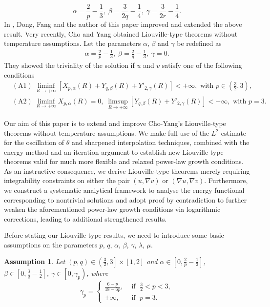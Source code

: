\documentclass[11pt,reqno]{amsart}
\newtheorem{Assum}{Assumption}[section]
\numberwithin{Thm}{section}
\begin{document}
$$
\alpha=\frac{2}{p}-\frac{1}{3},\;\beta=\frac{3}{2q}-\frac{1}{4},\;\gamma=\frac{3}{2r}-\frac{1}{4}.
$$
In \cite{DFZ26}, Dong, Fang and the author of this paper improved and extended the above result.
Very recently, Cho and Yang \cite{CY26} obtained  Liouville-type theorems without temperature assumptions.
Let the parameters $\alpha$, $\beta$ and $\gamma$ be redefined as
\begin{align}\label{abc}
\alpha=\frac{2}{p}-\frac{1}{3},\;\beta=\frac{2}{q}-\frac{1}{3},\;\gamma=0.
\end{align}
They showed the triviality of the solution if $u$ and $v$ satisfy one of the following conditions
\begin{align}
&\mathrm{(A1)}\;\liminf\limits_{R\rightarrow+\infty}\left[X_{p,\alpha}(R)+Y_{q,\beta}(R)+Y'_{2,\gamma}(R)\right]<+\infty, \text{ with }p\in\left(\frac{3}{2},3\right),\label{c1.3}\\
&\mathrm{(A2)}\;\liminf\limits_{R\rightarrow+\infty}X_{p,\alpha}(R)=0,\;\limsup\limits_{R\rightarrow+\infty}\left[Y_{q,\beta}(R)+Y'_{2,\gamma}(R)\right]<+\infty, \text{ with }p=3.\label{c1.4}
\end{align}


Our aim of this paper is to extend and improve Cho-Yang's Liouville-type theorems without temperature assumptions.
We make full use of the $L^2$-estimate for the oscillation of $\theta$ and sharpened interpolation techniques, combined with the energy method and an iteration argument to
establish new Liouville-type theorems valid for much more flexible and relaxed power-law growth conditions. As an instructive consequence, we derive Liouville-type theorems merely requiring integrability constraints on either the pair \((u,\nabla v)\) or \((\nabla u,\nabla v)\).
Furthermore, we construct a systematic analytical framework to analyse the energy functional corresponding to nontrivial solutions and adopt proof by contradiction to further weaken the aforementioned power-law growth conditions via logarithmic corrections, leading to additional strengthened results.


Before stating our Liouville-type results, we need to introduce some basic assumptions on the parameters $p$, $q$, $\alpha$, $\beta$, $\gamma$, $\lambda$, $\mu$.
\begin{Assum}\label{a1.1}
Let $(p,q)\in\left(\frac{3}{2},3\right]\times[1,2]$ and $\alpha\in\left[0,\frac{2}{p}-\frac{1}{3}\right]$, $\beta\in\left[0,\frac{3}{q}-\frac{1}{2}\right]$, $\gamma\in\left[0,\gamma_p\right)$, where
\begin{equation*}
\gamma_p=
\begin{cases}
\frac{6-p}{18-6p}, & \text{ if }\;\frac{3}{2}<p<3, \\
+\infty, & \text{ if }\;p=3.
\end{cases}
\end{equation*}
\end{Assum}
\end{document}
